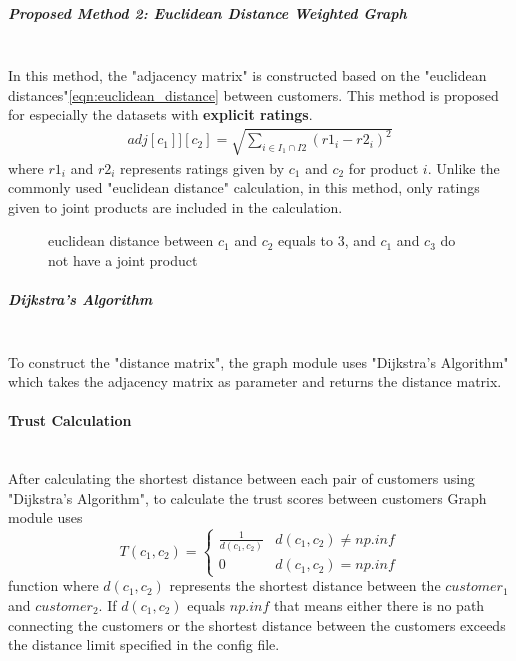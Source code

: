 	\subparagraph{Proposed Method 2: Euclidean Distance Weighted Graph}\mbox{}\\
	\label{prop_method_2}
	In this method, the "adjacency matrix" is constructed based on the "euclidean distances"\ref{eqn:euclidean_distance} between customers. This method is proposed for especially the datasets with \textbf{explicit ratings}.
	\begin{equation} 
	\label{eqn:euclidean_distance}
	\begin{split}
	adj[c_{1}]][c_{2}] = \sqrt{\sum_{i\in I_{1}\cap I{2}}^{} (r1_{i}-r2_{i})^2}
	\end{split}
	\end{equation}
	where $r1_{i}$ and $r2_{i}$ represents ratings given by $c_{1}$ and $c_{2}$ for product $i$. Unlike the commonly used "euclidean distance" calculation, in this method, only ratings given to joint products are included in the calculation.
	\begin{figure}[H]
		\centering
		\caption{euclidean distance between $c_{1}$ and $c_{2}$ equals to 3, and $c_{1}$ and $c_{3}$ do not have a joint product}
	\end{figure}
	
	\subparagraph{Dijkstra's Algorithm}\mbox{}\\
	To construct the "distance matrix", the graph module uses "Dijkstra's Algorithm"\cite{Dijkstra} which takes the adjacency matrix as parameter and returns the distance matrix.
	
	\paragraph{Trust Calculation}\mbox{}\\
	After calculating the shortest distance between each pair of customers using "Dijkstra's Algorithm", to calculate the trust scores between customers Graph module uses
	\begin{equation*} 
	T(c_{1}, c_{2})= \left\{
	\begin{array}{lr} 
	\frac{1}{d(c_{1}, c_{2})} & d(c_{1}, c_{2}) \neq np.inf \\
	0 & d(c_{1}, c_{2}) = np.inf
	\end{array}
	\right.
	\end{equation*}
	function where $d(c_{1}, c_{2})$ represents the shortest distance between the $customer_{1}$ and $customer_{2}$. If $d(c_{1}, c_{2})$ equals $np.inf$ that means either there is no path connecting the customers or the shortest distance between the customers exceeds the distance limit specified in the config file. \\
	
